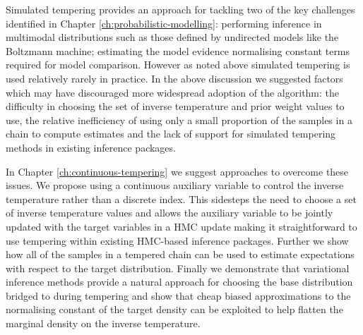 Simulated tempering provides an approach for tackling two of the key challenges identified in Chapter \ref{ch:probabilistic-modelling}: performing inference in multimodal distributions such as those defined by undirected models like the Boltz\-mann machine; estimating the model evidence normalising constant terms required for model comparison. However as noted above simulated tempering is used relatively rarely in practice. In the above discussion we suggested factors which may have discouraged more widespread adoption of the algorithm: the difficulty in choosing the set of inverse temperature and prior weight values to use, the relative inefficiency of using only a small proportion of the samples in a chain to compute estimates and the lack of support for simulated tempering methods in existing inference packages. 

In Chapter \ref{ch:continuous-tempering} we suggest approaches to overcome these issues. We propose using a continuous auxiliary variable to control the inverse temperature rather than a discrete index. This sidesteps the need to choose a set of inverse temperature values and allows the auxiliary variable to be jointly updated with the target variables in a \ac{HMC} update making it straightforward to use tempering within existing \ac{HMC}-based inference packages. Further we show how all of the samples in a tempered chain can be used to estimate expectations with respect to the target distribution. Finally we demonstrate that variational inference methods provide a natural approach for choosing the base distribution bridged to during tempering and show that cheap biased approximations to the normalising constant of the target density can be exploited to help flatten the marginal density on the inverse temperature.





